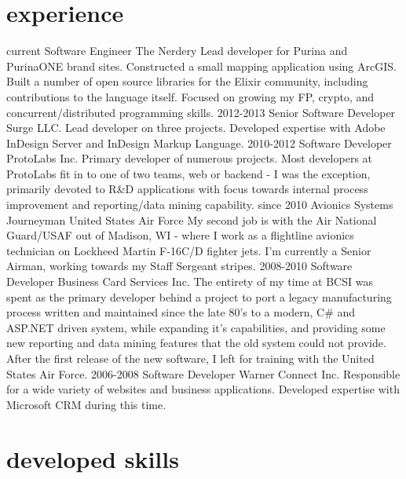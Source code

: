 \documentclass[print]{schoens-cv}
\begin{document}
\section{experience}

\begin{entrylist}
    \entry
         {current}
         {Software Engineer}
         {The Nerdery}
         {Lead developer for Purina and PurinaONE brand sites. Constructed a small mapping application using ArcGIS. Built a number of open source libraries for the Elixir community, including contributions to the language itself. Focused on growing my FP, crypto, and concurrent/distributed programming skills.}
	\entry
		{2012-2013}
		{Senior Software Developer}
		{Surge LLC.}
		{Lead developer on three projects. Developed expertise with Adobe InDesign Server and %
		 InDesign Markup Language.}
	\entry
		{2010-2012}
		{Software Developer}
		{ProtoLabs Inc.}
		{Primary developer of numerous projects. Most developers at ProtoLabs fit in to one of two teams, %
		 web or backend - I was the exception, primarily devoted to R\&D applications with focus towards %
		 internal process improvement and reporting/data mining capability.}
	\entry
		{since 2010}
		{Avionics Systems Journeyman}
		{United States Air Force}
		{My second job is with the Air National Guard/USAF out of Madison, WI - where I work as a flightline %
		 avionics technician on Lockheed Martin F-16C/D fighter jets. I'm currently a Senior Airman, working %
		 towards my Staff Sergeant stripes.}
	\entry
		{2008-2010}
		{Software Developer}
		{Business Card Services Inc.}
		{The entirety of my time at BCSI was spent as the primary developer behind a project to port a %
		 legacy manufacturing process written and maintained since the late 80's to a modern, C\# and ASP.NET %
		 driven system, while expanding it's capabilities, and providing some new reporting and data mining %
		 features that the old system could not provide. After the first release of the new software, I left %
		 for training with the United States Air Force.}
	\entry
		{2006-2008}
		{Software Developer}
		{Warner Connect Inc.}
		{Responsible for a wide variety of websites and business applications. Developed expertise with Microsoft CRM during this time.}
\end{entrylist}

\section{developed skills}
\end{document}
